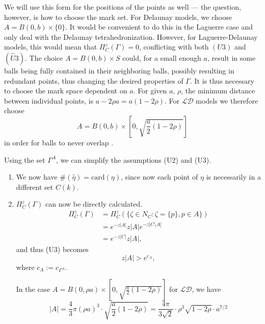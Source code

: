 We will use this form for the positions of the points as well --- the question, however, is how to choose the mark set. For Delaunay models, we choose $A=B(0,b)\times\{0\}$. It would be convenient to do this in the Laguerre case and only deal with the Delaunay tetrahedronization. However, for Laguerre-Delaunay models, this  would mean that $\Pi^z_C(\Gamma) = 0$, conflicting with both $(U3)$ and $(\hat U3)$. The choice $A=B(0,b)\times S$ could, for a small enough $a$, result in some balls being fully contained in their neighboring balls, possibly resulting in redundant points, thus changing the desired properties of $\Gamma$. It is thus necessary to choose the mark space dependent on $a$. For given $a$, $\rho$, the minimum distance between individual points, is $a-2\rho a = a(1-2\rho)$. For $\mathcal {LD}$ models we therefore choose 
$$A = B(0,b)\times \left[0, \sqrt{\frac a2(1-2\rho)}\right]$$ 
in order for balls to never overlap . 




\begin{remark}\label{r:UA}
	Using the set $\Gamma^A$, we can simplify the assumptions (U2) and (U3).
\begin{enumerate}[(U2)]	
	\item	We now have  $\#(\hat\eta) = \mathrm{card}(\eta)$, since now each point of $\eta$ is necessarily in a different set $C(k)$.

\item $\Pi^z_C(\Gamma)$ can now be directly calculated.
	\begin{align*} 
		\Pi^z_C(\Gamma) &= \Pi^z_C(\{\zeta \in N_C: \zeta = \{p\}, p \in A\}) \\
		& = e^{-z|A|} z |A| e^{-z|C\setminus A|} \\
		& = e^{-z|C|} z |A|,
	\end{align*}
	and thus (U3) becomes
	$$z|A| > e^{c_{A}},$$
	where $c_A := c_{\Gamma^A}$.

	In  the case $A = B(0,\rho a)\times [0, \sqrt{\frac a2(1-2\rho)}]$ for $\mathcal {LD}$, we have
	$$|A| = \frac 43 \pi (\rho a)^3 \cdot \sqrt{\frac a2(1-2\rho)} = \frac {4\pi}{3\sqrt{2}}\cdot  \rho^3 \sqrt{1-2\rho} \cdot a^{7/2}$$

\end{enumerate}
\end{remark}


